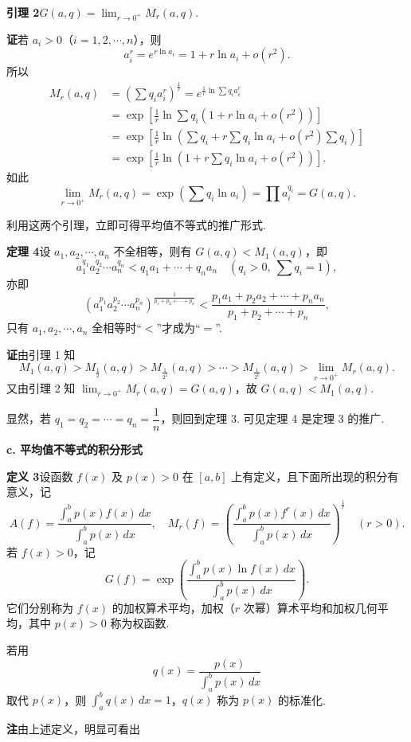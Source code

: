 \documentclass[UTF8,12pt,a4paper,fontset=fandol]{ctexart}
\begin{document}
\noindent\textbf{引理 2}\quad $G(a,q)=\displaystyle\lim_{r\to0^+}M_r(a,q)$.

\noindent\textbf{证}\quad 若 $a_i>0$（$i=1,2,\cdots,n$），则
\[
a_i^r=e^{r\ln a_i}=1+r\ln a_i+o(r^2).
\]
所以
\[
\begin{aligned}
M_r(a,q)
&=\left(\sum q_i a_i^r\right)^{\frac1r}
=e^{\frac1r\ln\sum q_i a_i^r}\\
&=\exp\left[\frac1r\ln\sum q_i(1+r\ln a_i+o(r^2))\right]\\
&=\exp\left[\frac1r\ln\left(\sum q_i+r\sum q_i\ln a_i+o(r^2)\sum q_i\right)\right]\\
&=\exp\left[\frac1r\ln\left(1+r\sum q_i\ln a_i+o(r^2)\right)\right].
\end{aligned}
\]
如此
\[
\lim_{r\to0^+}M_r(a,q)
=\exp\left(\sum q_i\ln a_i\right)=\prod a_i^{q_i}=G(a,q).
\]

利用这两个引理，立即可得平均值不等式的推广形式.

\noindent\textbf{定理 4}\quad 设 $a_1,a_2,\cdots,a_n$ 不全相等，则有 $G(a,q)<M_1(a,q)$，即
\[
a_1^{q_1}a_2^{q_2}\cdots a_n^{q_n}
<q_1a_1+\cdots+q_na_n\quad(q_i>0,\ \sum q_i=1),
\]
亦即
\[
(a_1^{p_1}a_2^{p_2}\cdots a_n^{p_n})^{\frac1{p_1+p_2+\cdots+p_n}}
<\frac{p_1a_1+p_2a_2+\cdots+p_na_n}{p_1+p_2+\cdots+p_n},
\]
只有 $a_1,a_2,\cdots,a_n$ 全相等时“$<$”才成为“$=$”.

\noindent\textbf{证}\quad 由引理 1 知
\[
M_1(a,q)>M_{\frac12}(a,q)>M_{\frac1{2^2}}(a,q)>\cdots>
M_{\frac1{2^k}}(a,q)>\lim_{r\to0^+}M_r(a,q).
\]
又由引理 2 知 $\displaystyle\lim_{r\to0^+}M_r(a,q)=G(a,q)$，故 $G(a,q)<M_1(a,q)$.

显然，若 $q_1=q_2=\cdots=q_n=\dfrac1n$，则回到定理 3. 可见定理 4 是定理 3 的推广.

\noindent\textbf{c. 平均值不等式的积分形式}

\noindent\textbf{定义 3}\quad 设函数 $f(x)$ 及 $p(x)>0$ 在 $[a,b]$ 上有定义，且下面所出现的积分有意义，记
\[
A(f)=\frac{\int_a^b p(x)f(x)\,dx}{\int_a^b p(x)\,dx},\quad
M_r(f)=\left(\frac{\int_a^b p(x)f^r(x)\,dx}{\int_a^b p(x)\,dx}\right)^{\frac1r}\quad(r>0).
\]
若 $f(x)>0$，记
\[
G(f)=\exp\left(\frac{\int_a^b p(x)\ln f(x)\,dx}{\int_a^b p(x)\,dx}\right).
\]
它们分别称为 $f(x)$ 的加权算术平均，加权（$r$ 次幂）算术平均和加权几何平均，其中 $p(x)>0$ 称为权函数.

若用
\[
q(x)=\frac{p(x)}{\int_a^b p(x)\,dx}
\]
取代 $p(x)$，则 $\displaystyle\int_a^b q(x)\,dx=1$，$q(x)$ 称为 $p(x)$ 的标准化.

\noindent\textbf{注}\quad 由上述定义，明显可看出
\end{document}
